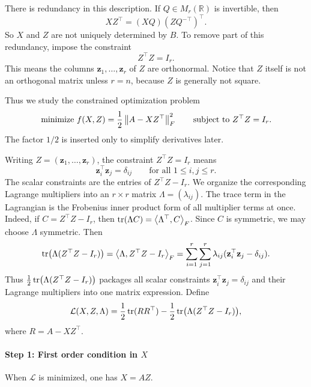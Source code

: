 There is redundancy in this description. If $Q\in M_r(\mathbb{R})$ is invertible, then
\[
    XZ^{\top}=(XQ)(ZQ^{-\top})^{\top}.
\]
So $X$ and $Z$ are not uniquely determined by $B$. To remove part of this redundancy, impose the constraint
\[
    Z^{\top}Z=I_r.
\]
This means the columns $\mathbf{z}_1,\ldots,\mathbf{z}_r$ of $Z$ are orthonormal. Notice that $Z$ itself is not an orthogonal matrix unless $r=n$, because $Z$ is generally not square.

Thus we study the constrained optimization problem
\[
    \text{minimize } f(X,Z)=\frac{1}{2}\left\lVert A-XZ^{\top} \right\rVert_F^2
    \qquad\text{subject to }Z^{\top}Z=I_r.
\]
The factor $1/2$ is inserted only to simplify derivatives later. 

Writing $Z=(\mathbf{z}_1,\ldots,\mathbf{z}_r)$, the constraint $Z^{\top}Z=I_r$ means
\[
    \mathbf{z}_i^{\top}\mathbf{z}_j=\delta_{ij}
    \qquad
    \text{for all }1\le i,j\le r.
\]
The scalar constraints are the entries of $Z^{\top}Z-I_r$. We organize the
corresponding Lagrange multipliers into an $r\times r$ matrix
$\Lambda=(\lambda_{ij})$. The trace term in the Lagrangian is the Frobenius
inner product form of all multiplier terms at once. Indeed, if
$C=Z^{\top}Z-I_r$, then $\operatorname{tr}(\Lambda C)=\left\langle \Lambda^{\top}, C \right\rangle_F$.
Since $C$ is symmetric, we may choose $\Lambda$ symmetric. Then
\[
    \operatorname{tr}\bigl(\Lambda(Z^{\top}Z-I_r)\bigr)
    =
    \left\langle \Lambda, Z^{\top}Z-I_r \right\rangle_F
    =
    \sum_{i=1}^r\sum_{j=1}^r
    \lambda_{ij}
    (\mathbf{z}_i^{\top}\mathbf{z}_j-\delta_{ij}).
\]
Thus $\frac{1}{2}\operatorname{tr}\bigl(\Lambda(Z^{\top}Z-I_r)\bigr)$ packages all scalar
constraints $\mathbf{z}_i^{\top}\mathbf{z}_j=\delta_{ij}$ and their Lagrange
multipliers into one matrix expression. Define
\[
    \mathcal{L}(X,Z,\Lambda)
    =
    \frac{1}{2}\operatorname{tr}(RR^{\top})
    -
    \frac{1}{2}\operatorname{tr}\bigl(\Lambda(Z^{\top}Z-I_r)\bigr),
\]
where $R=A-XZ^{\top}$.

\paragraph*{Step 1: First order condition in $X$}

\begin{theorem}
When $\mathcal{L}$ is minimized, one has $X=AZ$.
\end{theorem}

